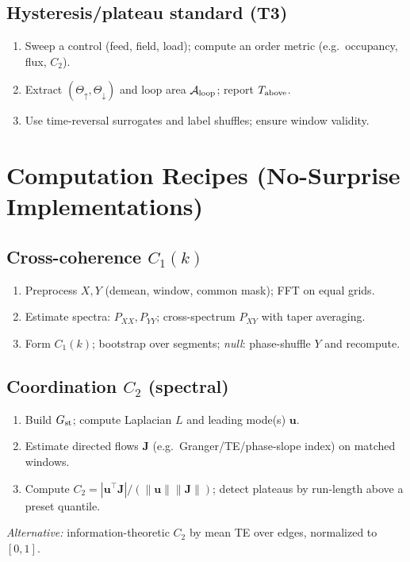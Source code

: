\documentclass[12pt,a4paper,oneside]{scrreprt}
\begin{document}
\section*{Hysteresis/plateau standard (T3)}
\begin{enumerate}
\item Sweep a control (feed, field, load); compute an order metric (e.g.\ occupancy, flux, $C_2$).
\item Extract $(\Theta_\uparrow,\Theta_\downarrow)$ and loop area $\mathcal A_{\rm loop}$; report $T_{\rm above}$.
\item Use time-reversal surrogates and label shuffles; ensure window validity.
\end{enumerate}

\chapter{Computation Recipes (No-Surprise Implementations)}\label{app:recipes}
\section*{Cross-coherence $C_1(k)$}
\begin{enumerate}
\item Preprocess $X,Y$ (demean, window, common mask); FFT on equal grids.
\item Estimate spectra: $P_{XX},P_{YY}$; cross-spectrum $P_{XY}$ with taper averaging.
\item Form $C_1(k)$; bootstrap over segments; \emph{null}: phase-shuffle $Y$ and recompute.
\end{enumerate}

\section*{Coordination $C_2$ (spectral)}
\begin{enumerate}
\item Build $G_{\rm st}$; compute Laplacian $L$ and leading mode(s) $\mathbf u$.
\item Estimate directed flows $\mathbf J$ (e.g.\ Granger/TE/phase-slope index) on matched windows.
\item Compute $C_2=|\mathbf u^\top\mathbf J|/(\|\mathbf u\|\|\mathbf J\|)$; detect plateaus by run-length above a preset quantile.
\end{enumerate}
\emph{Alternative:} information-theoretic $C_2$ by mean TE over edges, normalized to $[0,1]$.
\end{document}
